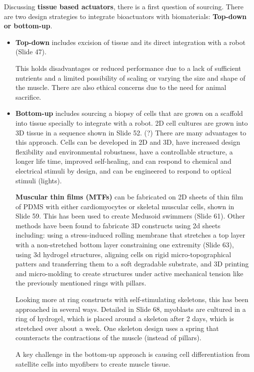 \documentclass[onecolumn,a4paper]{article}
\begin{document}
Discussing \textbf{tissue based actuators}, there is a first question of sourcing. There are two design strategies to integrate bioactuators with biomaterials: \textbf{Top-down or bottom-up}. 
\begin{itemize}
    \item \textbf{Top-down} includes excision of tissue and its direct integration with a robot (Slide 47).

    This holds disadvantages or reduced performance due to a lack of sufficient nutrients and a limited possibility of scaling or varying the size and shape of the muscle. There are also ethical concerns due to the need for animal sacrifice.
    
    \item \textbf{Bottom-up} includes sourcing a biopsy of cells that are grown on a scaffold into tissue specially to integrate with a robot. 2D cell cultures are grown into 3D tissue in a sequence shown in Slide 52. (?) There are many advantages to this approach. Cells can be developed in 2D and 3D, have increased design flexibility and environmental robustness, have a controllable structure, a longer life time, improved self-healing, and can respond to chemical and electrical stimuli by design, and can be engineered to respond to optical stimuli (lights).
    
    \textbf{Muscular thin films (MTFs)} can be fabricated on 2D sheets of thin film of PDMS with either cardiomyocytes or skeletal muscular cells, shown in Slide 59. This has been used to create Medusoid swimmers (Slide 61). Other methods have been found to fabricate 3D constructs using 2d sheets including: using a stress-induced rolling membrane that stretches a top layer with a non-stretched bottom layer constraining one extremity (Slide 63), using 3d hydrogel structures, aligning cells on rigid micro-topographical patters and transferring them to a soft degradable substrate, and 3D printing and micro-molding to create structures under active mechanical tension like the previously mentioned rings with pillars.

    Looking more at ring constructs with self-stimulating skeletons, this has been approached in several ways. Detailed in Slide 68, myoblasts are cultured in a ring of hydrogel, which is placed around a skeleton after 2 days, which is stretched over about a week. One skeleton design uses a spring that counteracts the contractions of the muscle (instead of pillars).
    
    A key challenge in the bottom-up approach is causing cell differentiation from satellite cells into myofibers to create muscle tissue.  
\end{itemize}
\end{document}
